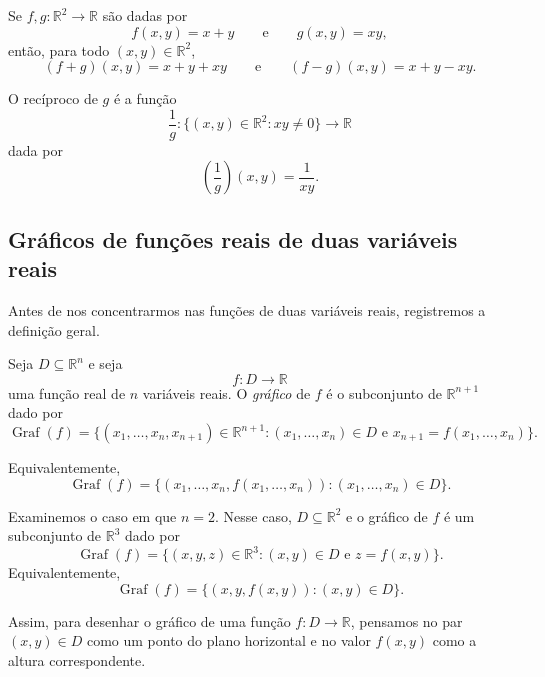 \begin{example}
    Se $f,g:\mathbb R^2\to\mathbb R$ são dadas por
    \[
        f(x,y)=x+y
        \qquad\text{e}\qquad
        g(x,y)=xy,
    \]
    então, para todo $(x,y)\in\mathbb R^2$,
    \[
        (f+g)(x,y)=x+y+xy \qquad \text{e}\qquad (f-g)(x,y)=x+y-xy.
    \]

    O recíproco de $g$ é a função
    \[
        \frac{1}{g}:\{(x,y)\in\mathbb R^2:xy\neq 0\}\to\mathbb R
    \]
    dada por
    \[
        \left(\frac{1}{g}\right)(x,y)=\frac{1}{xy}.
    \]
\end{example}

\subsection{Gráficos de funções reais de duas variáveis reais}

Antes de nos concentrarmos nas funções de duas variáveis reais, registremos a definição geral.

\begin{definition}
    Seja $D\subseteq\mathbb R^n$ e seja
    \[
        f:D\to\mathbb R
    \]
    uma função real de $n$ variáveis reais.
    O \emph{gráfico} de $f$ é o subconjunto de $\mathbb R^{n+1}$ dado por
    \[
        \operatorname{Graf}(f)
        =
        \{(x_1,\ldots,x_n,x_{n+1})\in\mathbb R^{n+1}:(x_1,\ldots,x_n)\in D \text{ e } x_{n+1}=f(x_1,\ldots,x_n)\}.
    \]

    Equivalentemente,
    \[
        \operatorname{Graf}(f)
        =
        \{(x_1,\ldots,x_n,f(x_1,\ldots,x_n)):(x_1,\ldots,x_n)\in D\}.
    \]
\end{definition}
Examinemos o caso em que $n=2$.
Nesse caso, $D\subseteq\mathbb R^2$ e o gráfico de $f$ é um subconjunto de $\mathbb R^3$ dado por
\[
    \operatorname{Graf}(f)
    =
    \{(x,y,z)\in\mathbb R^3:(x,y)\in D \text{ e } z=f(x,y)\}.
\]
Equivalentemente,
\[
    \operatorname{Graf}(f)
    =
    \{(x,y,f(x,y)):(x,y)\in D\}.
\]

Assim, para desenhar o gráfico de uma função $f:D\to\mathbb R$, pensamos no par $(x,y)\in D$ como um ponto do plano horizontal e no valor $f(x,y)$ como a altura correspondente.

